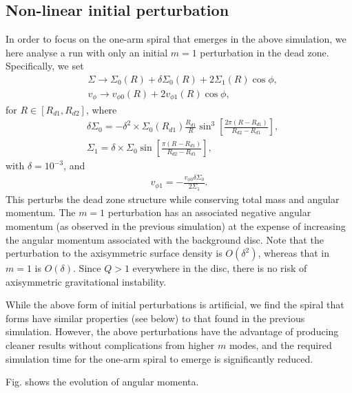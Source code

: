 \subsection{Non-linear initial perturbation}
In order to focus on the one-arm spiral that emerges in the above
simulation, we here analyse a run with only an initial $m=1$
perturbation in the dead zone. Specifically, we set
\begin{align}
  &\Sigma \to \Sigma_0(R) + \delta\Sigma_0(R) + 2\Sigma_1(R)\cos{\phi},\\
  &v_\phi  \to v_{\phi 0}(R) + 2v_{\phi 1}(R)\cos{\phi},
\end{align}
for $R\in[R_{d1},R_{d2}]$, where
\begin{align}
  &\delta\Sigma_0 =
  -\delta^2\times\Sigma_0(R_{d1})\frac{R_{d1}}{R}\sin^3{\left[\frac{2\pi\left(R-R_{d1}\right)}{R_{d2}-R_{d1}}\right]},\\ 
  &\Sigma_1 =
  \delta\times\Sigma_0\sin{\left[\frac{\pi\left(R-R_{d1}\right)}{R_{d2}-R_{d1}}\right]},  
\end{align}
with $\delta = 10^{-3}$, and
\begin{align}
  v_{\phi 1} = -\frac{v_{\phi 0}\delta\Sigma_0}{2\Sigma_1}. 
\end{align}
This perturbs the dead zone structure while conserving total mass and
angular momentum. The $m=1$ perturbation has an associated negative
angular momentum (as observed in the previous simulation) at the
expense of increasing the angular momentum associated with the
background disc. %
Note that the perturbation to the axisymmetric surface density is
$O(\delta^2)$, whereas that in $m=1$ is $O(\delta)$. Since $Q>1$
everywhere in the disc, there is no risk of axisymmetric gravitational
instability. 

While the above form of initial perturbations is artificial, we find 
the spiral that forms have similar properties (see below) to that found in the
previous simulation. However, the above perturbations have the
advantage of producing cleaner results without complications from
higher $m$ modes, and the required simulation time for the one-arm
spiral to emerge is significantly reduced. 

Fig. shows the evolution of angular momenta. 

